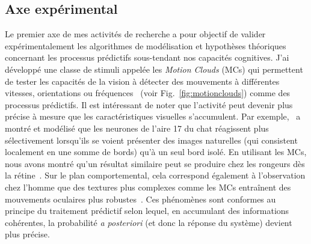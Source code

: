\documentclass[10pt,french,a4paper]{article}%
\begin{document}
\subsection{Axe expérimental}

Le premier axe de mes activités de recherche a pour objectif de valider expérimentalement les algorithmes de modélisation et hypothèses théoriques concernant les processus prédictifs sous-tendant nos capacités cognitives. J'ai développé une classe de stimuli appelée les \emph{Motion Clouds} (MCs) qui permettent de tester les capacités de la vision à détecter des mouvements à différentes vitesses, orientations ou fréquences~\citep{Sanz12}  (voir Fig.~\ref{fig:motionclouds}) comme des processus prédictifs. Il est intéressant de noter que l'activité peut devenir plus précise à mesure que les caractéristiques visuelles s'accumulent. Par exemple,~\citep{Kremkow16} a montré et modélisé que les neurones de l'aire 17 du chat réagissent plus sélectivement lorsqu'ils se voient présenter des images naturelles (qui consistent localement en une somme de bords) qu'à un seul bord isolé. En utilisant les MCs, nous avons montré qu'un résultat similaire peut se produire chez les rongeurs dès la rétine~\citep{Ravello19}. Sur le plan comportemental, cela correspond également à l'observation chez l'homme que des textures plus complexes comme les MCs entraînent des mouvements oculaires plus robustes~\citep{Simoncini12}. Ces phénomènes sont conformes au principe du traitement prédictif selon lequel, en accumulant des informations cohérentes, la probabilité \emph{a posteriori} (et donc la réponse du système) devient plus précise.
\end{document}
